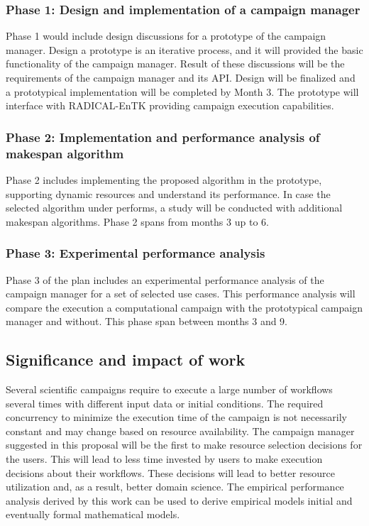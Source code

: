 \subsubsection{Phase 1: Design and implementation of a campaign manager}
Phase 1 would include design discussions for a prototype of the campaign manager.
Design a prototype is an iterative process, and it will provided the basic functionality of the campaign manager.
Result of these discussions will be the requirements of the campaign manager and its API. 
Design will be finalized and a prototypical implementation will be completed by Month 3. 
The prototype will interface with RADICAL-EnTK providing campaign execution capabilities.

\subsubsection{Phase 2: Implementation and performance analysis of makespan algorithm}
Phase 2 includes implementing the proposed algorithm in the prototype, supporting dynamic resources and understand its performance.
In case the selected algorithm under performs, a study will be conducted with additional makespan algorithms.
Phase 2 spans from months 3 up to 6.

\subsubsection{Phase 3: Experimental performance analysis}
Phase 3 of the plan includes an experimental performance analysis of the campaign manager for a set of selected use cases.
This performance analysis will compare the execution a computational campaign with the prototypical campaign manager and without.
This phase span between months 3 and 9.

\subsection{Significance and impact of work}
Several scientific campaigns require to execute a large number of workflows several times with different input data or initial conditions. 
The required concurrency to minimize the execution time of the campaign is not necessarily constant and may change based on resource availability. 
The campaign manager suggested in this proposal will be the first to make resource selection decisions for the users. 
This will lead to less time invested by users to make execution decisions about their workflows. 
These decisions will lead to better resource utilization and, as a result, better domain science. 
The empirical performance analysis derived by this work can be used to derive empirical models initial and eventually formal mathematical models.

